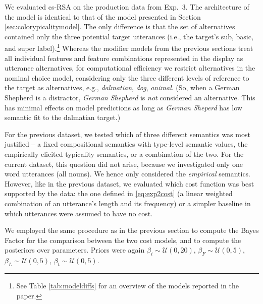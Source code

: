 \documentclass[11pt]{article}
\newcommand{\tableref}[1]{Table \ref{#1}}
\newcommand{\sectionref}[1]{Section \ref{#1}}
\begin{document}
We evaluated cs-RSA on the production data from Exp.~3. The architecture of the model is identical to that of the model presented in \sectionref{sec:colorypicalitymodel}. The only difference is that the set of alternatives contained only the three potential target utterances (i.e., the target's sub, basic, and super label).\footnote{See \tableref{tab:modeldiffs} for an overview of the models reported in the paper.} Whereas the modifier models from the previous sections treat all individual features and feature combinations represented in the display as utterance alternatives, for computational efficiency we restrict alternatives in the nominal choice model, considering only the three different levels of reference to the target as alternatives, e.g., \emph{dalmatian}, \emph{dog}, \emph{animal}. (So, when a German Shepherd is a distractor, \emph{German Shepherd} is \emph{not} considered an alternative. This has minimal effects on model predictions as long as \emph{German Sheperd} has low semantic fit to the dalmatian target.) 

For the previous dataset, we tested which of three different semantics was most justified -- a fixed compositional semantics with type-level semantic values, the empirically elicited typicality semantics, or a combination of the two. For the current dataset, this question did not arise, because we investigated only one word utterances (all nouns). We hence only considered the \emph{empirical} semantics. However, like in the previous dataset, we evaluated which cost function was best supported by the data: the one defined in \eqref{eq:exp2cost} (a linear weighted combination of an utterance's length and its frequency) or a simpler baseline in which utterances were assumed to have no cost.


We employed the same procedure as in the previous section to compute the Bayes Factor for the comparison between the two cost models, and to compute the posteriors over parameters. Priors were again  $\beta_i  \sim \mathcal{U}(0,20)$,  $\beta_{F} \sim \mathcal{U}(0,5)$, $\beta_{L} \sim \mathcal{U}(0,5)$, $\beta_t  \sim \mathcal{U}(0,5)$.
\end{document}
